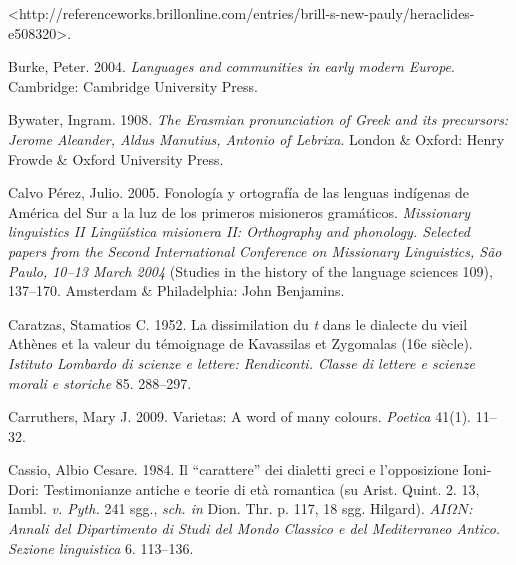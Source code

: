 \begin{styleStandard}
{\textless}http://referenceworks.brillonline.com/entries/brill-s-new-pauly/heraclides-e508320{\textgreater}.
\end{styleStandard}

\begin{styleStandard}
Burke, Peter. 2004. \textit{Languages and communities in early modern Europe}. Cambridge: Cambridge University Press.
\end{styleStandard}

\begin{styleStandard}
Bywater, Ingram. 1908. \textit{The Erasmian pronunciation of Greek and its precursors: Jerome Aleander, Aldus Manutius, Antonio of Lebrixa}. London \& Oxford: Henry Frowde \& Oxford University Press.
\end{styleStandard}

\begin{styleStandard}
Calvo Pérez, Julio. 2005. Fonología y ortografía de las lenguas indígenas de América del Sur a la luz de los primeros misioneros gramáticos. \textit{Missionary linguistics II {\textbar} Lingüística misionera II: Orthography and phonology. Selected papers from the Second International Conference on Missionary Linguistics, São Paulo, 10–13 March 2004} (Studies in the history of the language sciences 109), 137–170. Amsterdam \& Philadelphia: John Benjamins.
\end{styleStandard}

\begin{styleStandard}
Caratzas, Stamatios C. 1952. La dissimilation du \textit{t} dans le dialecte du vieil Athènes et la valeur du témoignage de Kavassilas et Zygomalas (16e siècle). \textit{Istituto Lombardo di scienze e lettere: Rendiconti. Classe di lettere e scienze morali e storiche} 85. 288–297.
\end{styleStandard}

\begin{styleStandard}
Carruthers, Mary J. 2009. Varietas: A word of many colours. \textit{Poetica} 41(1). 11–32.
\end{styleStandard}

\begin{styleStandard}
Cassio, Albio Cesare. 1984. Il “carattere” dei dialetti greci e l’opposizione Ioni-Dori: Testimonianze antiche e teorie di età romantica (su Arist. Quint. 2. 13, Iambl. \textit{v. Pyth.} 241 sgg., \textit{sch. in} Dion. Thr. p. 117, 18 sgg. Hilgard). \textit{$AI\Omega N$: Annali del Dipartimento di Studi del Mondo Classico e del Mediterraneo Antico. Sezione linguistica} 6. 113–136.
\end{styleStandard}

